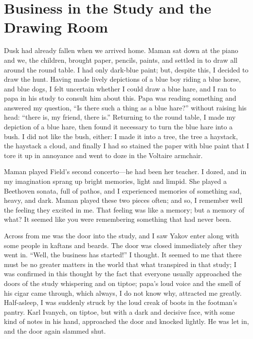 \chapter{Business in the Study and the Drawing Room}

Dusk had already fallen when we arrived home. Maman sat down at the piano and we, the children, brought paper, pencils, paints, and settled in to draw all around the round table. I had only dark-blue paint; but, despite this, I decided to draw the hunt. Having made lively depictions of a blue boy riding a blue horse, and blue dogs, I felt uncertain whether I could draw a blue hare, and I ran to papa in his study to consult him about this. Papa was reading something and answered my question, ``Is there such a thing as a blue hare?'' without raising his head: ``there is, my friend, there is.'' Returning to the round table, I made my depiction of a blue hare, then found it necessary to turn the blue hare into a bush. I did not like the bush, either: I made it into a tree, the tree a haystack, the haystack a cloud, and finally I had so stained the paper with blue paint that I tore it up in annoyance and went to doze in the Voltaire armchair.

Maman played Field's second concerto---he had been her teacher. I dozed, and in my imagination sprang up bright memories, light and limpid. She played a Beethoven sonata, full of pathos, and I experienced memories of something sad, heavy, and dark. Maman played these two pieces often; and so, I remember well the feeling they excited in me. That feeling was like a memory; but a memory of what? It seemed like you were remembering something that had never been.

 Across from me was the door into the study, and I saw Yakov enter along with some people in kaftans and beards. The door was closed immediately after they went in. ``Well, the business has started!'' I thought. It seemed to me that there must be no greater matters in the world that what transpired in that study; I was confirmed in this thought by the fact that everyone usually approached the doors of the study whispering and on tiptoe; papa's loud voice and the smell of his cigar came through, which always, I do not know why, attracted me greatly. Half-asleep, I was suddenly struck by the loud creak of boots in the footman's pantry. Karl Ivanych, on tiptoe, but with a dark and decisive face, with some kind of notes in his hand, approached the door and knocked lightly. He was let in, and the door again slammed shut.

